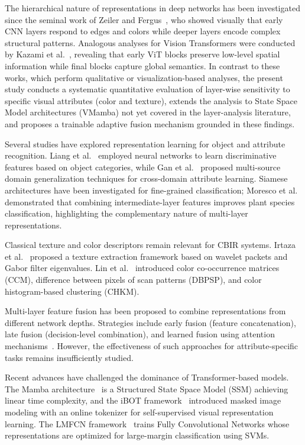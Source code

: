 \documentclass[letterpaper, 10 pt, conference]{ieeeconf}
\begin{document}
The hierarchical nature of representations in deep networks has been
investigated since the seminal work of Zeiler and
Fergus~\cite{bzeiler}, who showed visually that early CNN layers respond
to edges and colors while deeper layers encode complex structural patterns.
Analogous analyses for Vision Transformers were conducted by
Kazami et al.~\cite{bkazami}, revealing that early ViT blocks preserve
low-level spatial information while final blocks capture global semantics.
In contrast to these works, which perform qualitative or visualization-based
analyses, the present study conducts a systematic quantitative evaluation
of layer-wise sensitivity to specific visual attributes (color and
texture), extends the analysis to State Space Model architectures (VMamba)
not yet covered in the layer-analysis literature, and proposes a trainable
adaptive fusion mechanism grounded in these findings.

Several studies have explored representation learning for object and
attribute recognition.
Liang et al.~\cite{b10} employed neural networks to learn discriminative
features based on object categories, while Gan et al.~\cite{b11} proposed
multi-source domain generalization techniques for cross-domain attribute
learning.
Siamese architectures have been investigated for fine-grained
classification; Moresco et al.~\cite{b8} demonstrated that combining
intermediate-layer features improves plant species classification,
highlighting the complementary nature of multi-layer representations.

Classical texture and color descriptors remain relevant for CBIR systems.
Irtaza et al.~\cite{b13} proposed a texture extraction framework based on
wavelet packets and Gabor filter eigenvalues.
Lin et al.~\cite{b15} introduced color co-occurrence matrices (CCM),
difference between pixels of scan patterns (DBPSP), and color
histogram-based clustering (CHKM).

Multi-layer feature fusion has been proposed to combine representations
from different network depths.
Strategies include early fusion (feature concatenation), late fusion
(decision-level combination), and learned fusion using attention
mechanisms~\cite{b26,b27}.
However, the effectiveness of such approaches for attribute-specific tasks
remains insufficiently studied.

Recent advances have challenged the dominance of Transformer-based models.
The Mamba architecture~\cite{b16} is a Structured State Space Model (SSM)
achieving linear time complexity, and the iBOT
framework~\cite{b17} introduced masked image modeling with an online
tokenizer for self-supervised visual representation learning.
The LMFCN framework~\cite{b28} trains Fully Convolutional Networks whose
representations are optimized for large-margin classification using SVMs.
\end{document}
